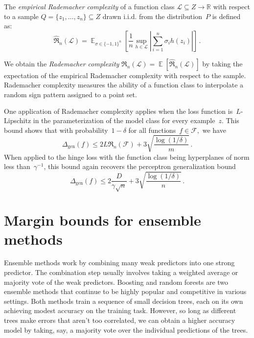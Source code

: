 \documentclass{tufte-book}
\begin{document}
The \emph{empirical Rademacher complexity} of a function class
\(\mathcal{L}\subseteq Z\to\mathbb{R}\) with respect to a sample
\(Q=\{z_1,\dots,z_n\}\subseteq Z\) drawn i.i.d. from the
distribution~\(P\) is defined as: \[
\widehat{\mathfrak{R}}_n(\mathcal{L})
=\mathop\mathbb{E}_{\sigma\in\{-1,1\}^n}
\left[
\frac 1n \sup_{h\in\mathcal{L}}
\left|
\sum_{i=1}^n \sigma_i h(z_i)
\right|
\right]\,.
\]

We obtain the \emph{Rademacher complexity}
\(\mathfrak{R}_n(\mathcal{L})=\mathop\mathbb{E}\left[\widehat{\mathfrak{R}}_n(\mathcal{L})\right]\)
by taking the expectation of the empirical Rademacher complexity with
respect to the sample. Rademacher complexity measures the ability of a
function class to interpolate a random sign pattern assigned to a point
set.

One application of Rademacher complexity applies when the loss function
is~\(L\)-Lipschitz in the parameterization of the model class for every
example~\(z\). This bound shows that with probability~\(1-\delta\) for
all functions~\(f\in\mathcal{F},\) we have \[
\Delta_{\mathrm{gen}}(f)\le 2L{\mathfrak{R}}_n(\mathcal{F}) + 3\sqrt{\frac{\log(1/\delta)}{m}}\,.
\] When applied to the hinge loss with the function class being
hyperplanes of norm less than~\(\gamma^{-1}\), this bound again recovers
the perceptron generalization bound \[
\Delta_{\mathrm{gen}}(f)\le 2 \frac{D}{\gamma \sqrt{n}}
 + 3\sqrt{\frac{\log(1/\delta)}{n}}\,.
\]

\hypertarget{margin-bounds-for-ensemble-methods}{%
\section{Margin bounds for ensemble
methods}\label{margin-bounds-for-ensemble-methods}}


Ensemble methods work by combining many weak predictors into one strong
predictor. The combination step usually involves taking a weighted
average or majority vote of the weak predictors. Boosting and random
forests are two ensemble methods that continue to be highly popular and
competitive in various settings. Both methods train a sequence of small
decision trees, each on its own achieving modest accuracy on the
training task. However, so long as different trees make errors that
aren't too correlated, we can obtain a higher accuracy model by taking,
say, a majority vote over the individual predictions of the trees.
\end{document}
